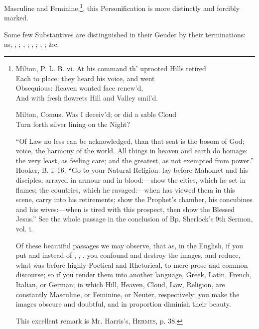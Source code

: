 Masculine and Feminine,\footnote{
  \begin{aquote}{Milton, P. L. B. vi.}
    At his command th' uprooted Hills retired\\
    Each to  place: they heard his voice, and went\\
    Obsequious: Heaven  wonted face renew'd,\\
    And with fresh flowrets Hill and Valley smil'd.
  \end{aquote}

  \begin{aquote}{Milton, Comus.}
    Was I deceiv'd; or did a sable Cloud\\
    Turn forth  silver lining on the Night?
  \end{aquote}

  ``Of Law no less can be acknowledged, than that  seat is the
  bosom of God;  voice, the harmony of the world. All things in
  heaven and earth do  homage: the very least, as feeling
   care; and the greatest, as not exempted from 
  power.'' Hooker, B. i. 16. ``Go to your Natural Religion: lay before
   Mahomet and his disciples, arrayed in armour and in
  blood:---show  the cities, which he set in flames; the
  countries, which he ravaged:---when  has viewed them in this
  scene, carry  into his retirements; show  the
  Prophet's chamber, his concubines and his wives:---when  is
  tired with this prospect, then show  the Blessed Jesus.'' See
  the whole passage in the conclusion of Bp. Sherlock's 9th Sermon, vol.
  i.

  Of these beautiful passages we may observe, that as, in the English,
  if you put  and  instead of , ,
  , you confound and destroy the images, and reduce, what was
  before highly Poetical and Rhetorical, to mere prose and common
  discourse; so if you render them into another language, Greek, Latin,
  French, Italian, or German; in which Hill, Heaven, Cloud, Law,
  Religion, are constantly Masculine, or Feminine, or Neuter,
  respectively; you make the images obscure and doubtful, and in
  proportion diminish their beauty.

  This excellent remark is Mr. Harris's, \textsc{Hermes}, p. 38.}, this
Personification is more distinctly and forcibly marked.

Some few Substantives are distinguished in their Gender by their
terminations: as, , ; , ;
, ; , ; \&c.

